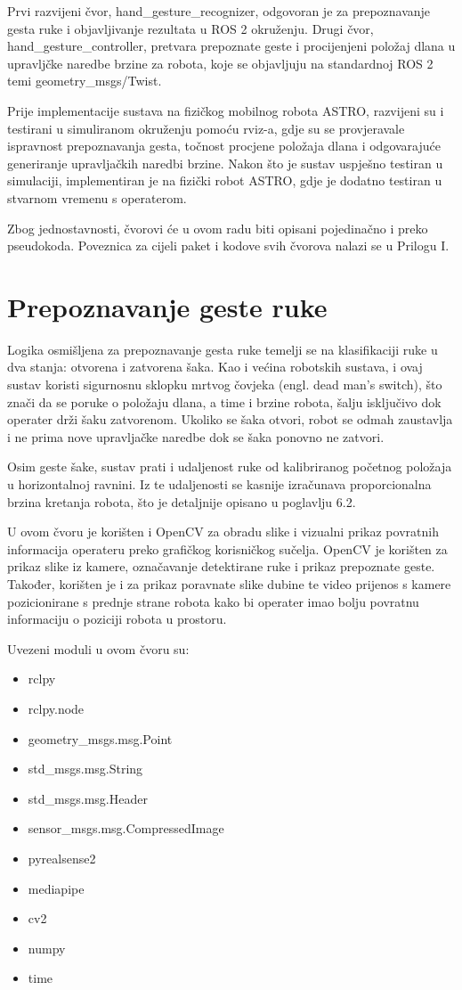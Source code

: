 \documentclass[12pt,a4paper,oneside]{report}
\begin{document}
Prvi razvijeni čvor, hand\_gesture\_recognizer, odgovoran je za prepoznavanje gesta ruke i objavljivanje 
rezultata u ROS 2 okruženju. Drugi čvor, hand\_gesture\_controller, pretvara prepoznate geste i 
procijenjeni položaj dlana u upravljčke naredbe brzine za robota, koje se objavljuju na standardnoj 
ROS 2 temi geometry\_msgs/Twist.

Prije implementacije sustava na fizičkog mobilnog robota ASTRO, razvijeni su i testirani u simuliranom
okruženju pomoću rviz-a, gdje su se provjeravale ispravnost prepoznavanja gesta, točnost procjene 
položaja dlana i odgovarajuće generiranje upravljačkih naredbi brzine. Nakon što je sustav uspješno testiran 
u simulaciji, implementiran je na fizički robot ASTRO, gdje je dodatno testiran u stvarnom vremenu s operaterom.

Zbog jednostavnosti, čvorovi će u ovom radu biti opisani pojedinačno i preko pseudokoda. Poveznica za cijeli 
paket i kodove svih čvorova nalazi se u Prilogu I.

\section{Prepoznavanje geste ruke}
Logika osmišljena za prepoznavanje gesta ruke temelji se na klasifikaciji ruke u dva stanja: 
otvorena i zatvorena šaka. Kao i većina robotskih sustava, i ovaj sustav koristi sigurnosnu sklopku 
mrtvog čovjeka (engl. dead man's switch), što znači da se poruke o položaju dlana, a time i brzine robota, 
šalju isključivo dok operater drži šaku zatvorenom. Ukoliko se šaka otvori, robot se odmah zaustavlja i ne 
prima nove upravljačke naredbe dok se šaka ponovno ne zatvori. 

Osim geste šake, sustav prati i udaljenost ruke od kalibriranog početnog položaja u horizontalnoj ravnini. 
Iz te udaljenosti se kasnije izračunava proporcionalna brzina kretanja robota, što je detaljnije opisano u 
poglavlju 6.2.

U ovom čvoru je korišten i OpenCV za obradu slike i vizualni prikaz povratnih informacija operateru preko 
grafičkog korisničkog sučelja. OpenCV je korišten za prikaz slike iz kamere, označavanje detektirane ruke i
prikaz prepoznate geste. Također, korišten je i za prikaz poravnate slike dubine te video prijenos s kamere 
pozicionirane s prednje strane robota kako bi operater imao bolju povratnu informaciju o poziciji robota u 
prostoru.

Uvezeni moduli u ovom čvoru su:
\begin{itemize}
  \item rclpy
  \item rclpy.node
  \item geometry\_msgs.msg.Point
  \item std\_msgs.msg.String
  \item std\_msgs.msg.Header
  \item sensor\_msgs.msg.CompressedImage
  \item pyrealsense2
  \item mediapipe
  \item cv2
  \item numpy
  \item time
\end{itemize}
\end{document}
